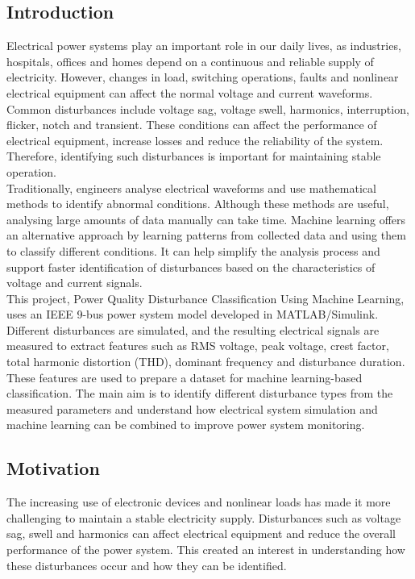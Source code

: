 \documentclass[12pt]{article}
\begin{document}
\begin{center}
\subsection{ Introduction}
\raggedright
\justifying
Electrical power systems play an important role in our daily lives, as industries, hospitals, offices and homes depend on a continuous and reliable supply of electricity. However, changes in load, switching operations, faults and nonlinear electrical equipment can affect the normal voltage and current waveforms. Common disturbances include voltage sag, voltage swell, harmonics, interruption, flicker, notch and transient. These conditions can affect the performance of electrical equipment, increase losses and reduce the reliability of the system. Therefore, identifying such disturbances is important for maintaining stable operation.\\

Traditionally, engineers analyse electrical waveforms and use mathematical methods to identify abnormal conditions. Although these methods are useful, analysing large amounts of data manually can take time. Machine learning offers an alternative approach by learning patterns from collected data and using them to classify different conditions. It can help simplify the analysis process and support faster identification of disturbances based on the characteristics of voltage and current signals.\\

This project, Power Quality Disturbance Classification Using Machine Learning, uses an IEEE 9-bus power system model developed in MATLAB/Simulink. Different disturbances are simulated, and the resulting electrical signals are measured to extract features such as RMS voltage, peak voltage, crest factor, total harmonic distortion (THD), dominant frequency and disturbance duration. These features are used to prepare a dataset for machine learning-based classification. The main aim is to identify different disturbance types from the measured parameters and understand how electrical system simulation and machine learning can be combined to improve power system monitoring.\\


\subsection{Motivation}
\raggedright
\justifying
 The increasing use of electronic devices and nonlinear loads has made it more challenging to maintain a stable electricity supply. Disturbances such as voltage sag, swell and harmonics can affect electrical equipment and reduce the overall performance of the power system. This created an interest in understanding how these disturbances occur and how they can be identified.\\


\end{center}
\end{document}
